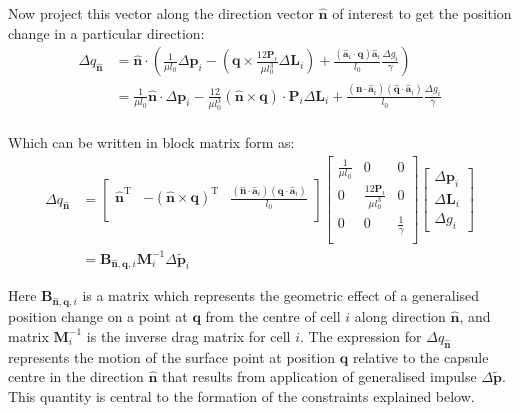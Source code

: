 \documentclass{report}
\let\oldhat\hat
\renewcommand{\vec}[1]{\mathbf{#1}}
\renewcommand{\hat}[1]{\oldhat{\mathbf{#1}}}
\newcommand{\mat}{\mathbf}
\newcommand{\invmat}[1]{\mat{#1}^{-1}}
\newcommand{\deltap}{\Delta \vec{p}}
\newcommand{\deltaL}{\Delta \vec{L}}
\newcommand{\deltag}{\Delta g}
\begin{document}
Now project this vector along the direction vector $\hat{n}$ of interest to get
the position change in a particular direction:
\begin{align*}
\Delta q_{\hat{n}}
&=
\hat{n} \cdot
\left(
\frac{1}{\mu l_0} \deltap_i -
(\vec{q} \times \frac{12\mat{P}_i}{\mu l_0^3}\deltaL_i) +
\frac{\left(\hat{a}_i\cdot\vec{q}\right)\hat{a}_i}{l_0}\frac{\deltag_i}{\gamma}
\right) \\
&=
\frac{1}{\mu l_0}\hat{n}\cdot\deltap_i -
\frac{12}{\mu l_0^3}\left(\hat{n}\times\vec{q}\right)\cdot \mat{P}_i\deltaL_i +
\frac{\left(\hat{n}\cdot\hat{a}_i\right)\left(\hat{q}\cdot\hat{a}_i\right)}{l_0}\frac{\deltag_i}{\gamma} \\
\end{align*}

Which can be written in block matrix form as:
\begin{align*}
\Delta  q_{\hat{n}}
&=
\left[
\begin{array}{lll}
\hat{n}^{\textrm{T}} & -\left(\hat{n}\times\vec{q}\right)^{\textrm{T}} &
\frac{\left(\hat{n}\cdot\hat{a}_i\right)\left(\vec{q}\cdot\hat{a}_i\right)}{l_0} \\
\end{array}
\right]
\left[
\begin{array}{lll}
\frac{1}{\mu l_0} & 0 & 0 \\
0 & \frac{12\mat{P}_i}{\mu l_0^3} & 0 \\
0 & 0 & \frac{1}{\gamma} \\
\end{array}
\right]
\left[
\begin{array}{l}
\deltap_i \\ \deltaL_i \\ \deltag_i
\end{array}
\right]\\
&= \mat{B}_{\hat{n},\vec{q},i}\invmat{M}_i\Delta\tilde{\vec{p}}_i
\end{align*}

Here $\mat{B}_{\hat{n},\vec{q},i}$ is a matrix which represents 
the geometric effect of a generalised position change on a point at $\vec{q}$
from the centre of cell $i$ along direction $\hat{n}$, and
matrix $\invmat{M}_i$ is the inverse drag matrix for cell $i$. 
The expression for $\Delta q_{\hat{n}}$ represents the motion of the surface point
at position $\vec{q}$ relative to the capsule centre in the direction $\hat{n}$ that
results from application of generalised impulse $\Delta \tilde{\vec{p}}$. This quantity is central
to the formation of the constraints explained below.
\end{document}
